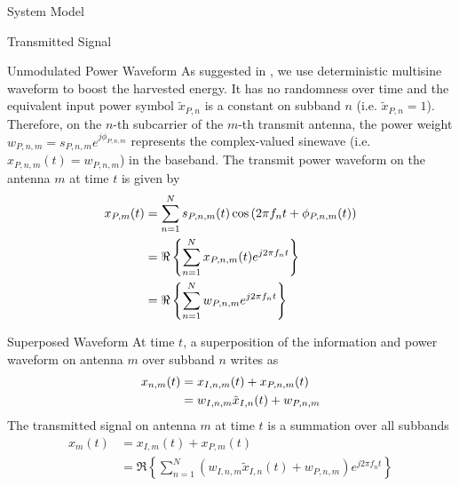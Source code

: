 \documentclass{IEEEtran}
\begin{document}
\begin{section} {System Model}
\begin{subsection} {Transmitted Signal}
            \begin{subsubsection} {Unmodulated Power Waveform}
                As suggested in \cite{Clerckx2018b,Clerckx2016a}, we use deterministic multisine waveform to boost the harvested energy. It has no randomness over time and the equivalent input power symbol $\tilde{x}_{P,n}$ is a constant on subband $n$ (i.e. $\tilde{x}_{P,n} = 1$). Therefore, on the $n$-th subcarrier of the $m$-th transmit antenna, the power weight $w_{P,n,m} = s_{P,n,m} e^{j\phi_{P,n,m}}$ represents the complex-valued sinewave (i.e. $x_{P,n,m}(t) = w_{P,n,m}$) in the baseband. The transmit power waveform on the antenna $m$ at time $t$ is given by
                \begin{equation} \label{eq:x{P,m}(t)}
                    \begin{split}
                        x_{P,m}(t)
                        &= \sum_{n=1}^{N} s_{P,n,m}(t) \cos \left( 2 \pi f_n t + \phi_{P,n,m}(t) \right) \\
                        &= \Re \left\{ \sum_{n=1}^{N} x_{P,n,m}(t) e^{j2 \pi f_n t} \right\} \\
                        &= \Re \left\{ \sum_{n=1}^{N} w_{P,n,m} e^{j2 \pi f_n t} \right\}
                    \end{split}
                \end{equation}
            \end{subsubsection}

            \begin{subsubsection} {Superposed Waveform}
                At time $t$, a superposition of the information and power waveform on antenna $m$ over subband $n$ writes as
                \begin{equation} \label{eq:x_{n,m}(t)}
                    \begin{split}
                        x_{n,m}(t)
                        &= x_{I,n,m}(t)+x_{P,n,m}(t) \\
                        &= w_{I,n,m} \tilde{x}_{I,n}(t)+w_{P,n,m}
                    \end{split}
                \end{equation}
                The transmitted signal on antenna $m$ at time $t$ is a summation over all subbands
                \begin{equation} \label{eq:x_m(t)}
                    \begin{split}
                        x_m(t)
                        &= x_{I,m}(t)+x_{P,m}(t) \\
                        &= \Re \left\{ \sum_{n=1}^{N} (w_{I,n,m} \tilde{x}_{I,n}(t)+w_{P,n,m}) e^{j2 \pi f_n t} \right\}
                    \end{split}
                \end{equation}
            \end{subsubsection}


\end{subsection}
\end{section}
\end{document}
